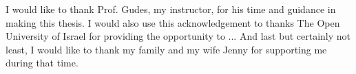 

I would like to thank Prof. Gudes, my instructor, for his time and guidance in making this thesis.  I would also use this acknowledgement to thanks The Open University of Israel for providing the opportunity to ...
And last but certainly not least, I would like to thank my family and my wife Jenny for supporting me during that time.
